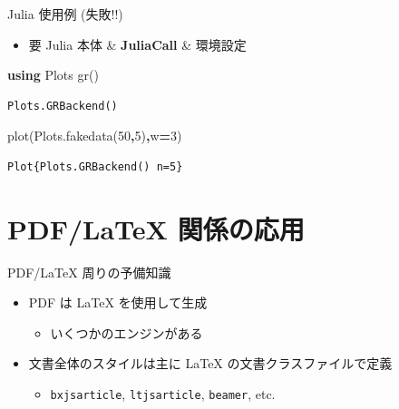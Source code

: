 \documentclass[
  ignorenonframetext,
]{beamer}
\newenvironment{Shaded}{\begin{snugshade}}{\end{snugshade}}
\newcommand{\FloatTok}[1]{\textcolor[rgb]{0.00,0.00,0.81}{#1}}
\newcommand{\KeywordTok}[1]{\textcolor[rgb]{0.13,0.29,0.53}{\textbf{#1}}}
\newcommand{\NormalTok}[1]{#1}
\newcommand{\OperatorTok}[1]{\textcolor[rgb]{0.81,0.36,0.00}{\textbf{#1}}}
\providecommand{\tightlist}{%
  \setlength{\itemsep}{0pt}\setlength{\parskip}{0pt}}
\begin{document}
\begin{frame}[fragile]{Julia 使用例 (失敗!!)}
\protect\hypertarget{julia-ux4f7fux7528ux4f8b-ux5931ux6557}{}
\begin{itemize}
\tightlist
\item
  要 Julia 本体 \& \textbf{JuliaCall} \& 環境設定
\end{itemize}

\begin{Shaded}
\begin{Highlighting}[]
\KeywordTok{using}\NormalTok{ Plots}
\NormalTok{gr()}
\end{Highlighting}
\end{Shaded}

\begin{verbatim}
Plots.GRBackend()
\end{verbatim}

\begin{Shaded}
\begin{Highlighting}[]
\NormalTok{plot(Plots.fakedata(}\FloatTok{50}\OperatorTok{,}\FloatTok{5}\NormalTok{)}\OperatorTok{,}\NormalTok{w}\OperatorTok{=}\FloatTok{3}\NormalTok{)}
\end{Highlighting}
\end{Shaded}

\begin{verbatim}
Plot{Plots.GRBackend() n=5}
\end{verbatim}
\end{frame}

\hypertarget{pdflatex-ux95a2ux4fc2ux306eux5fdcux7528}{%
\section{PDF/LaTeX 関係の応用}\label{pdflatex-ux95a2ux4fc2ux306eux5fdcux7528}}

\begin{frame}[fragile]{PDF/LaTeX 周りの予備知識}
\protect\hypertarget{pdflatex-ux5468ux308aux306eux4e88ux5099ux77e5ux8b58}{}
\begin{itemize}
\item
  PDF は LaTeX を使用して生成

  \begin{itemize}
  \tightlist
  \item
    いくつかのエンジンがある
  \end{itemize}
\item
  文書全体のスタイルは主に LaTeX の文書クラスファイルで定義

  \begin{itemize}
  \tightlist
  \item
    \texttt{bxjsarticle}, \texttt{ltjsarticle}, \texttt{beamer}, etc.
  \end{itemize}
\end{itemize}
\end{frame}
\end{document}
